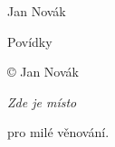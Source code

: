 \documentclass[10pt,a5paper]{book}
\makeatletter
\def\cleardoublepage{\clearpage\if@twoside \ifodd\c@page\else
	\begingroup
	\mbox{}
	\thispagestyle{empty}
	\newpage
	\endgroup\fi\fi}
\makeatother
\begin{document}
\pagestyle{empty}
\begin{center}
	\vspace*{\fill}
	\Huge\sc
	Jan Novák

	Povídky
	\vspace{1em}
	\vspace{\fill}
\end{center}
\clearpage

\vspace*{\fill}
{ 
	\setlength\parindent{0pt}

	© Jan Novák \the\year
}
\clearpage

\begin{flushright}
	\vspace*{\fill}
	\it
	Zde je místo

	pro milé věnování.
	\vspace{\fill}
\end{flushright}
\cleardoublepage

{
	\renewcommand{\bfseries}{\mdseries}
	\tableofcontents
}
\thispagestyle{empty}
\cleardoublepage

\pagestyle{fancy}

% 
% 
% 

% 
\end{document}
